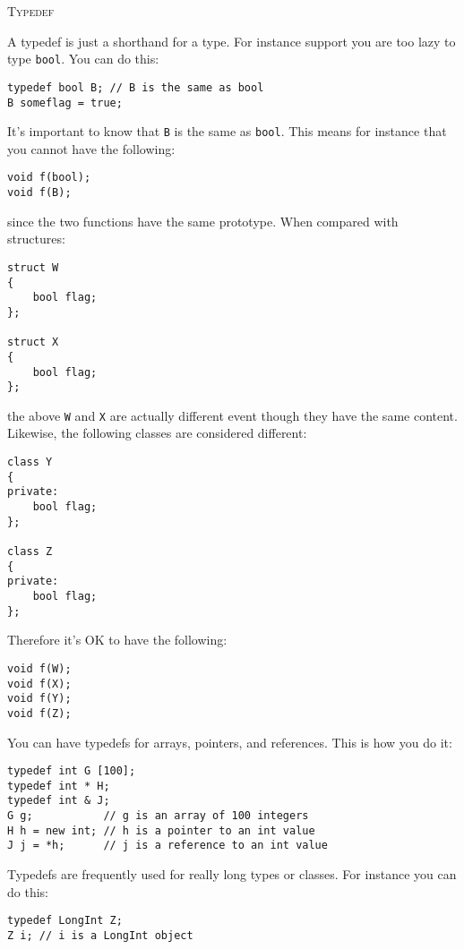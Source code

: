 \textsc{Typedef}

A typedef is just a shorthand for a type. For instance support you
are too lazy to type \verb!bool!. You can do this:

\begin{Verbatim}[frame=single,fontsize=\footnotesize]
typedef bool B; // B is the same as bool
B someflag = true; 
\end{Verbatim}

It's important to know that \verb!B! is the same as \verb!bool!. This 
means for instance that you cannot have the following:
\begin{Verbatim}[frame=single,fontsize=\footnotesize]
void f(bool);
void f(B);
\end{Verbatim}
since the two functions have the same prototype. When compared with 
structures:
\begin{Verbatim}[frame=single,fontsize=\footnotesize]
struct W 
{
    bool flag;
};

struct X
{
    bool flag;
};
\end{Verbatim}
the above \verb!W! and \verb!X! are actually different event though 
they have the same content. Likewise, the following classes are 
considered different:
\begin{Verbatim}[frame=single,fontsize=\footnotesize]
class Y
{
private:
    bool flag;
};

class Z
{
private:
    bool flag;
};
\end{Verbatim}

Therefore it's OK to have the following:
\begin{Verbatim}[frame=single,fontsize=\footnotesize]
void f(W);
void f(X);
void f(Y);
void f(Z);
\end{Verbatim}

You can have typedefs for arrays, pointers, and references. 
This is how you do it:
\begin{Verbatim}[frame=single,fontsize=\footnotesize]
typedef int G [100];
typedef int * H;
typedef int & J;
G g;           // g is an array of 100 integers
H h = new int; // h is a pointer to an int value
J j = *h;      // j is a reference to an int value
\end{Verbatim}

Typedefs are frequently used for really long types or classes. 
For instance you can do this:

\begin{Verbatim}[frame=single,fontsize=\footnotesize]
typedef LongInt Z;
Z i; // i is a LongInt object
\end{Verbatim}

